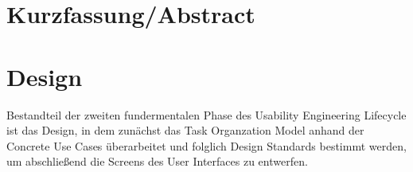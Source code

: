 \documentclass[a4paper,11pt]{article}%
\renewcommand{\\}{\vspace*{0.5\baselineskip} \newline}
\begin{document}
	\section*{Kurzfassung/Abstract}
	\newpage
	
	\tableofcontents
	\newpage
	
	\listoftables{}
	\newpage
	
	\listoffigures{}
	\newpage
	
	
	\newpage
	
	
	\newpage
	
	
	\newpage
	
	
	\newpage
	
	
	\newpage
	
	
	\newpage
	
	
	\newpage
	
	\section{Design}
	Bestandteil der zweiten fundermentalen Phase des Usability Engineering Lifecycle ist das Design, in dem zunächst das Task Organzation Model anhand der Concrete Use Cases überarbeitet und folglich Design Standards bestimmt werden, um abschließend die Screens des User Interfaces zu entwerfen. 
	
	\newpage
	
\end{document}
